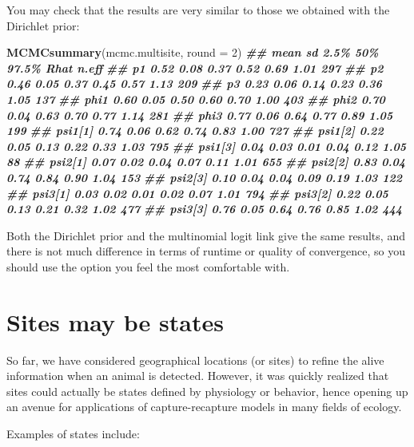 \documentclass[
  12pt,
]{krantz}
\newenvironment{Shaded}{\begin{snugshade}}{\end{snugshade}}
\newcommand{\AttributeTok}[1]{\textcolor[rgb]{0.13,0.29,0.53}{#1}}
\newcommand{\DecValTok}[1]{\textcolor[rgb]{0.00,0.00,0.81}{#1}}
\newcommand{\DocumentationTok}[1]{\textcolor[rgb]{0.56,0.35,0.01}{\textbf{\textit{#1}}}}
\newcommand{\FunctionTok}[1]{\textcolor[rgb]{0.13,0.29,0.53}{\textbf{#1}}}
\newcommand{\NormalTok}[1]{#1}
\begin{document}
You may check that the results are very similar to those we obtained with the Dirichlet prior:

\begin{Shaded}
\begin{Highlighting}[]
\FunctionTok{MCMCsummary}\NormalTok{(mcmc.multisite, }\AttributeTok{round =} \DecValTok{2}\NormalTok{)}
\DocumentationTok{\#\#         mean   sd 2.5\%  50\% 97.5\% Rhat n.eff}
\DocumentationTok{\#\# p1      0.52 0.08 0.37 0.52  0.69 1.01   297}
\DocumentationTok{\#\# p2      0.46 0.05 0.37 0.45  0.57 1.13   209}
\DocumentationTok{\#\# p3      0.23 0.06 0.14 0.23  0.36 1.05   137}
\DocumentationTok{\#\# phi1    0.60 0.05 0.50 0.60  0.70 1.00   403}
\DocumentationTok{\#\# phi2    0.70 0.04 0.63 0.70  0.77 1.14   281}
\DocumentationTok{\#\# phi3    0.77 0.06 0.64 0.77  0.89 1.05   199}
\DocumentationTok{\#\# psi1[1] 0.74 0.06 0.62 0.74  0.83 1.00   727}
\DocumentationTok{\#\# psi1[2] 0.22 0.05 0.13 0.22  0.33 1.03   795}
\DocumentationTok{\#\# psi1[3] 0.04 0.03 0.01 0.04  0.12 1.05    88}
\DocumentationTok{\#\# psi2[1] 0.07 0.02 0.04 0.07  0.11 1.01   655}
\DocumentationTok{\#\# psi2[2] 0.83 0.04 0.74 0.84  0.90 1.04   153}
\DocumentationTok{\#\# psi2[3] 0.10 0.04 0.04 0.09  0.19 1.03   122}
\DocumentationTok{\#\# psi3[1] 0.03 0.02 0.01 0.02  0.07 1.01   794}
\DocumentationTok{\#\# psi3[2] 0.22 0.05 0.13 0.21  0.32 1.02   477}
\DocumentationTok{\#\# psi3[3] 0.76 0.05 0.64 0.76  0.85 1.02   444}
\end{Highlighting}
\end{Shaded}

Both the Dirichlet prior and the multinomial logit link give the same results, and there is not much difference in terms of runtime or quality of convergence, so you should use the option you feel the most comfortable with.

\section{Sites may be states}\label{states}

So far, we have considered geographical locations (or sites) to refine the alive information when an animal is detected. However, it was quickly realized that sites could actually be states defined by physiology or behavior, hence opening up an avenue for applications of capture-recapture models in many fields of ecology.

Examples of states include:
\end{document}
